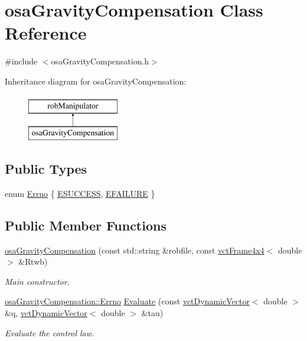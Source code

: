 \hypertarget{classosa_gravity_compensation}{\section{osa\-Gravity\-Compensation Class Reference}
\label{classosa_gravity_compensation}
}


{\ttfamily \#include $<$osa\-Gravity\-Compensation.\-h$>$}

Inheritance diagram for osa\-Gravity\-Compensation\-:\begin{figure}[H]
\begin{center}
\leavevmode
\includegraphics[height=2.000000cm]{d2/d17/classosa_gravity_compensation}
\end{center}
\end{figure}
\subsection*{Public Types}
\begin{DoxyCompactItemize}
\item 
enum \hyperlink{classosa_gravity_compensation_a179d78f4a936077a2c75ba01ff9f0331}{Errno} \{ \hyperlink{classosa_gravity_compensation_a179d78f4a936077a2c75ba01ff9f0331a8a21250fa311b657e14fca50d6be30e0}{E\-S\-U\-C\-C\-E\-S\-S}, 
\hyperlink{classosa_gravity_compensation_a179d78f4a936077a2c75ba01ff9f0331a2961d66ff650ae6e10681848900c5491}{E\-F\-A\-I\-L\-U\-R\-E}
 \}
\end{DoxyCompactItemize}
\subsection*{Public Member Functions}
\begin{DoxyCompactItemize}
\item 
\hyperlink{classosa_gravity_compensation_aa2b2a285c799d1722331c00b3a0dd899}{osa\-Gravity\-Compensation} (const std\-::string \&robfile, const \hyperlink{classvct_frame4x4}{vct\-Frame4x4}$<$ double $>$ \&Rtwb)
\begin{DoxyCompactList}\small\item\em Main constructor. \end{DoxyCompactList}\item 
\hyperlink{classosa_gravity_compensation_a179d78f4a936077a2c75ba01ff9f0331}{osa\-Gravity\-Compensation\-::\-Errno} \hyperlink{classosa_gravity_compensation_a018b9d1f7912687cd82ce183c8699cd6}{Evaluate} (const \hyperlink{classvct_dynamic_vector}{vct\-Dynamic\-Vector}$<$ double $>$ \&q, \hyperlink{classvct_dynamic_vector}{vct\-Dynamic\-Vector}$<$ double $>$ \&tau)
\begin{DoxyCompactList}\small\item\em Evaluate the control law. \end{DoxyCompactList}\end{DoxyCompactItemize}
